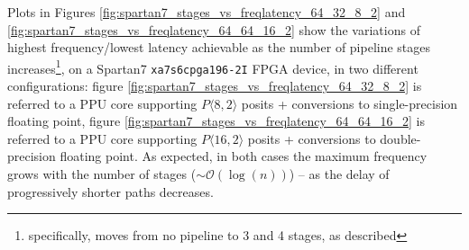 Plots in Figures \ref{fig:spartan7_stages_vs_freqlatency_64_32_8_2} and \ref{fig:spartan7_stages_vs_freqlatency_64_64_16_2} show the variations of highest frequency/lowest latency achievable as the number of pipeline stages increases\footnote{specifically, moves from no pipeline to 3 and 4 stages, as described}, on a Spartan7 \texttt{xa7s6cpga196-2I} FPGA device, in two different configurations: figure \ref{fig:spartan7_stages_vs_freqlatency_64_32_8_2} is referred to a  PPU core supporting $P\langle8,2\rangle$ posits + conversions to single-precision floating point, figure \ref{fig:spartan7_stages_vs_freqlatency_64_64_16_2} is referred to a PPU core supporting $P\langle16,2\rangle$ posits + conversions to double-precision floating point.
As expected, in both cases the maximum frequency grows with the number of stages ($\sim \mathcal{O}(\log(n))$) -- as the delay of progressively shorter paths decreases.





